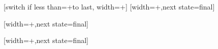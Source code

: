 %

{
  [switch if less than=+\pgfsnakesegmentlength to last,
               width=+\pgfsnakesegmentlength]
  {
    \pgfpathmoveto{\pgfpointorigin}
    \pgfpathlineto{\pgfpointpolar{\pgfsnakesegmentangle}{+\pgfsnakesegmentamplitude}}
  }
  [width=+\pgfsnakesegmentamplitude,next state=final]
  {
    \pgfpathmoveto{\pgfpointorigin}
    \pgfpathlineto{\pgfpointpolar{\pgfsnakesegmentangle}{+\pgfsnakesegmentamplitude}}
  }  
  {
    \pgfpathmoveto{\pgfqpoint{\pgfsnakeremainingdistance}{0pt}}
  }
}




%

{
  [width=+\pgfsnakeremainingdistance,next state=final]
  {
    \pgfpathmoveto{\pgfpointorigin}
    \pgfpathcurveto
    {\pgfqpoint{.15\pgfsnakesegmentamplitude}{.3\pgfsnakesegmentamplitude}}
    {\pgfqpoint{.5\pgfsnakesegmentamplitude}{.5\pgfsnakesegmentamplitude}}
    {\pgfqpoint{\pgfsnakesegmentamplitude}{.5\pgfsnakesegmentamplitude}}
    {
      \pgftransformxshift{+\pgfsnakesegmentaspect\pgfsnakeremainingdistance}
      \pgfpathlineto{\pgfqpoint{-\pgfsnakesegmentamplitude}{.5\pgfsnakesegmentamplitude}}
      \pgfpathcurveto
      {\pgfqpoint{-.5\pgfsnakesegmentamplitude}{.5\pgfsnakesegmentamplitude}}
      {\pgfqpoint{-.15\pgfsnakesegmentamplitude}{.7\pgfsnakesegmentamplitude}}
      {\pgfqpoint{0\pgfsnakesegmentamplitude}{1\pgfsnakesegmentamplitude}}
      \pgfpathcurveto
      {\pgfqpoint{.15\pgfsnakesegmentamplitude}{.7\pgfsnakesegmentamplitude}}
      {\pgfqpoint{.5\pgfsnakesegmentamplitude}{.5\pgfsnakesegmentamplitude}}
      {\pgfqpoint{\pgfsnakesegmentamplitude}{.5\pgfsnakesegmentamplitude}}
    }
    {
      \pgftransformxshift{+\pgfsnakeremainingdistance}
      \pgfpathlineto{\pgfqpoint{-\pgfsnakesegmentamplitude}{.5\pgfsnakesegmentamplitude}}
      \pgfpathcurveto
      {\pgfqpoint{-.5\pgfsnakesegmentamplitude}{.5\pgfsnakesegmentamplitude}}
      {\pgfqpoint{-.15\pgfsnakesegmentamplitude}{.3\pgfsnakesegmentamplitude}}
      {\pgfqpoint{0pt}{0pt}}
    }
  }
  {}
}



%
%

{
  [width=+\pgfsnakeremainingdistance,next state=final]
  {
    \pgfpathcurveto
    {\pgfqpoint{\pgfsnakesegmentaspect\pgfsnakeremainingdistance}{\pgfsnakesegmentamplitude}}
    {\pgfpointadd{\pgfqpoint{\pgfsnakeremainingdistance}{0pt}}
       {\pgfqpoint{-\pgfsnakesegmentaspect\pgfsnakeremainingdistance}{\pgfsnakesegmentamplitude}}}
    {\pgfqpoint{\pgfsnakeremainingdistance}{0pt}}
  }
  {}
}



\endinput
